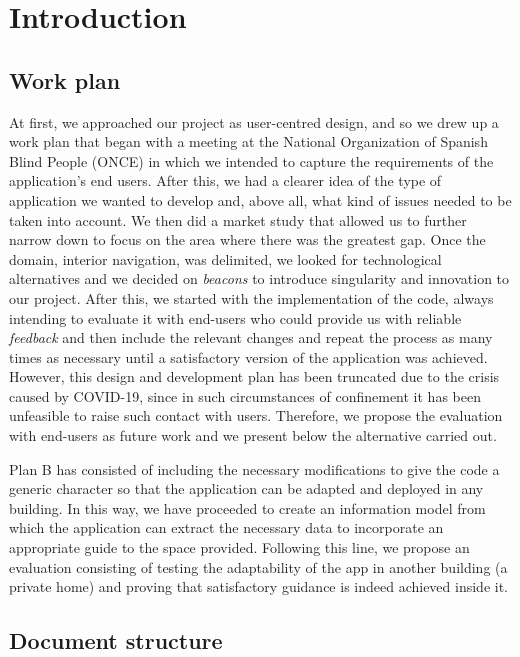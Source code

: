 \chapter{Introduction}
\label{cap:introduction}


\section{Work plan}
\label{sec:workPlan}


At first, we approached our project as user-centred design, and so we drew up a work plan that began with a meeting at the National Organization of Spanish Blind People (ONCE) in which we intended to capture the requirements of the application's end users. After this, we had a clearer idea of the type of application we wanted to develop and, above all, what kind of issues needed to be taken into account. We then did a market study that allowed us to further narrow down to focus on the area where there was the greatest gap. Once the domain, interior navigation, was delimited, we looked for technological alternatives and we decided on \textit{beacons} to introduce singularity and innovation to our project. After this, we started with the implementation of the code, always intending to evaluate it with end-users who could provide us with reliable \textit{feedback} and then include the relevant changes and repeat the process as many times as necessary until a satisfactory version of the application was achieved. However, this design and development plan has been truncated due to the crisis caused by COVID-19, since in such circumstances of confinement it has been unfeasible to raise such contact with users. Therefore, we propose the evaluation with end-users as future work and we present below the alternative carried out.

Plan B has consisted of including the necessary modifications to give the code a generic character so that the application can be adapted and deployed in any building. In this way, we have proceeded to create an information model from which the application can extract the necessary data to incorporate an appropriate guide to the space provided. Following this line, we propose an evaluation consisting of testing the adaptability of the app in another building (a private home) and proving that satisfactory guidance is indeed achieved inside it.


\section{Document structure}

